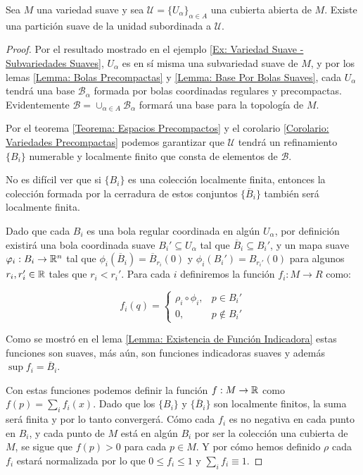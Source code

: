 \begin{theorem}\label{Teorema: Existencia de Particiones Suave de la Unidad}
	Sea $M$ una variedad suave y sea $\mathcal{U} = \{U_\alpha\}_{\alpha \in A}$ una cubierta abierta de $M$. Existe una partición suave de la unidad subordinada a $\mathcal{U}$.
\end{theorem}

\begin{proof}
	Por el resultado mostrado en el ejemplo \ref{Ex: Variedad Suave - Subvariedades Suaves}, $U_\alpha$ es en sí misma una subvariedad suave de $M$, y por los lemas \ref{Lemma: Bolas Precompactas} y \ref{Lemma: Base Por Bolas Suaves}, cada $U_\alpha$ tendrá una base $\mathcal{B}_\alpha$ formada por bolas coordinadas regulares y precompactas. Evidentemente $\mathcal{B} = \cup_{\alpha \in A} \mathcal{B}_\alpha$ formará una base para la topología de $M$.

	Por el teorema \ref{Teorema: Espacios Precompactos} y el corolario \ref{Corolario: Variedades Precompactas} podemos garantizar que $\mathcal{U}$ tendrá un refinamiento $\{B_i\}$ numerable y localmente finito que consta de elementos de $\mathcal{B}$.

	No es difícil ver que si $\{B_i\}$ es una colección localmente finita, entonces la colección formada por la cerradura de estos conjuntos $\{\overline{B}_i\}$ también será localmente finita.


	Dado que cada $B_i$ es una bola regular coordinada en algún $U_\alpha$, por definición existirá una bola coordinada suave $B_i' \subseteq U_\alpha$ tal que $\overline{B}_{i} \subseteq B_i'$, y un mapa suave $\varphi_i: B_i \to \mathbb{R}^n$ tal que $\phi_i(\overline{B}_i) = \overline{B}_{r_i}(0)$ y $\phi_i(B_i') = B_{r_i'}(0)$ para algunos $r_i, r_i' \in \mathbb{R}$ tales que $r_i < r_i'$. Para cada $i$ definiremos la función $f_i: M \to R$ como:

	\[
		f_i(q)= \begin{cases}
			\rho_i \circ \phi_i, & p \in B_i'    \\
			0,                   & p \notin B_i'
		\end{cases}
	\]

	Como se mostró en el lema \ref{Lemma: Existencia de Función Indicadora} estas funciones son suaves, más aún, son funciones indicadoras suaves y además $\sup f_i = \overline{B}_i$.

	Con estas funciones podemos definir la función $f: M \to \mathbb{R}$ como $f(p) = \sum_i f_i(x)$. Dado que los $\{B_i\}$ y $\{\overline{B}_i\}$ son localmente finitos, la suma será finita y por lo tanto convergerá. Cómo cada $f_i$ es no negativa en cada punto en $B_i$, y cada punto de $M$ está en algún $B_i$ por ser la colección una cubierta de $M$, se sigue que $f(p) > 0$ para cada $p \in M$. Y por cómo hemos definido $\rho$ cada $f_i$ estará normalizada por lo que $0 \leq f_i \leq 1$ y $\sum_i f_i \equiv 1$.


\end{proof}
